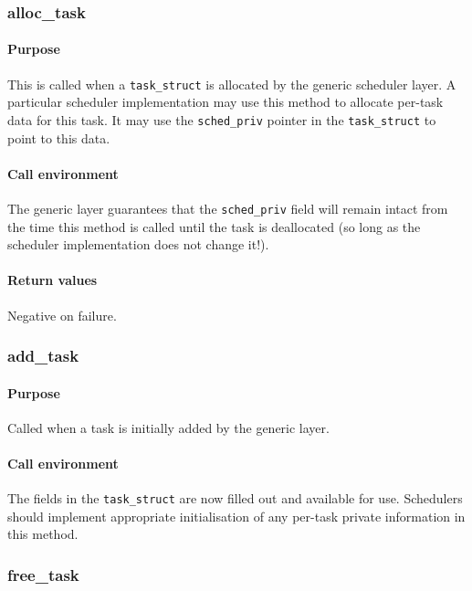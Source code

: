 \documentclass[11pt,twoside,final,openright]{xenstyle}
\begin{document}
\subsubsection{alloc\_task}

\paragraph*{Purpose}
This is called when a {\tt task\_struct} is allocated by the generic scheduler
layer.  A particular scheduler implementation may use this method to allocate
per-task data for this task.  It may use the {\tt sched\_priv} pointer in the
{\tt task\_struct} to point to this data.

\paragraph*{Call environment}
The generic layer guarantees that the {\tt sched\_priv} field will
remain intact from the time this method is called until the task is
deallocated (so long as the scheduler implementation does not change
it!).

\paragraph*{Return values}
Negative on failure.

\subsubsection{add\_task}

\paragraph*{Purpose}

Called when a task is initially added by the generic layer.

\paragraph*{Call environment}

The fields in the {\tt task\_struct} are now filled out and available for use.
Schedulers should implement appropriate initialisation of any per-task private
information in this method.

\subsubsection{free\_task}
\end{document}
